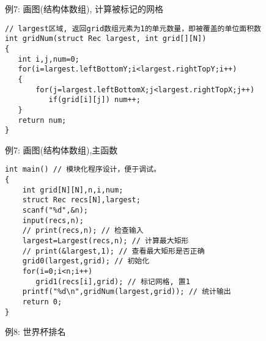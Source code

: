\begin{frame}{例7: 画图(结构体数组), 计算被标记的网格}
\begin{lstlisting}
// largest区域, 返回grid数组元素为1的单元数量，即被覆盖的单位面积数 
int gridNum(struct Rec largest, int grid[][N])
{
   int i,j,num=0;
   for(i=largest.leftBottomY;i<largest.rightTopY;i++)
   {
       for(j=largest.leftBottomX;j<largest.rightTopX;j++)
          if(grid[i][j]) num++;
   } 
   return num;
}
\end{lstlisting}
\end{frame}

\begin{frame}{例7: 画图(结构体数组),主函数}
\vspace{-0.4cm}
\begin{lstlisting}
int main() // 模块化程序设计，便于调试。
{
    int grid[N][N],n,i,num;
    struct Rec recs[N],largest;
    scanf("%d",&n);
    input(recs,n);
    // print(recs,n); // 检查输入 
    largest=Largest(recs,n); // 计算最大矩形 
    // print(&largest,1); // 查看最大矩形是否正确 
    grid0(largest,grid); // 初始化 
    for(i=0;i<n;i++)
       grid1(recs[i],grid); // 标记网格, 置1 
    printf("%d\n",gridNum(largest,grid)); // 统计输出 
    return 0;
}
\end{lstlisting}
\end{frame}

\begin{frame}{例8: 世界杯排名}
\end{frame}

